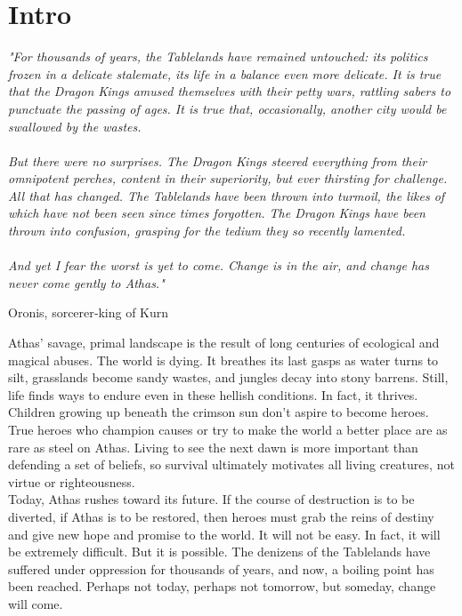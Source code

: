 \chapter{Intro}\label{chap:intro}

\epigraph{\textit{
"For thousands of years, the Tablelands have remained untouched: its politics frozen in a delicate stalemate,
its life in a balance even more delicate. It is true that the Dragon Kings amused themselves with their petty
wars, rattling sabers to punctuate the passing of ages. It is true that, occasionally, another city would be
swallowed by the wastes.\\
\\
But there were no surprises. The Dragon Kings steered everything from their omnipotent perches, content in
their superiority, but ever thirsting for challenge. All that has changed. The Tablelands have been thrown into
turmoil, the likes of which have not been seen since times forgotten. The Dragon Kings have been thrown
into confusion, grasping for the tedium they so recently lamented.\\
\\
And yet I fear the worst is yet to come. Change is in the air, and change has never come gently to Athas."
} }{
Oronis, sorcerer‐king of Kurn
}

Athas' savage, primal landscape is the result of long centuries of ecological and magical abuses. The world is
dying. It breathes its last gasps as water turns to silt, grasslands become sandy wastes, and jungles decay into
stony barrens. Still, life finds ways to endure even in these hellish conditions. In fact, it thrives.
Children growing up beneath the crimson sun don’t aspire to become heroes. True heroes who champion causes
or try to make the world a better place are as rare as steel on Athas. Living to see the next dawn is more
important than defending a set of beliefs, so survival ultimately motivates all living creatures, not virtue or
righteousness.\\

Today, Athas rushes toward its future. If the course of destruction is to be diverted, if Athas is to be restored,
then heroes must grab the reins of destiny and give new hope and promise to the world. It will not be easy. In fact, it will
be extremely difficult. But it is possible. The denizens of the Tablelands have suffered under oppression for thousands of
years, and now, a boiling point has been reached. Perhaps not today, perhaps not tomorrow, but someday, change will
come.

